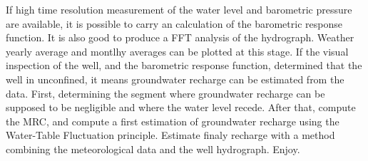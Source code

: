 \documentclass[WHATMANUAL.tex]{subfiles}
\begin{document}
If high time resolution measurement of the water level and barometric pressure are available, it is possible to carry an calculation of the barometric response function. It is also good to produce a FFT analysis of the hydrograph.
Weather yearly average and montlhy averages can be plotted at this stage.
If the visual inspection of the well, and the barometric response function, determined that the well in unconfined, it means groundwater recharge can be estimated from the data. First, determining the segment where groundwater recharge can be supposed to be negligible and where the water level recede. After that, compute the MRC, and compute a first estimation of groundwater recharge using the Water-Table Fluctuation principle. Estimate finaly recharge with a method combining the meteorological data and the well hydrograph. Enjoy.
\end{document}
